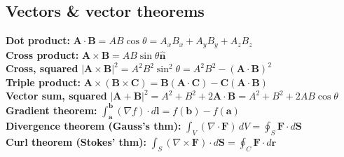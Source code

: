 \documentclass[letterpaper,landscape,10pt]{article}
\begin{document}
{\begin{multicols}{4}
	\subsection*{Vectors \& vector theorems}
	\textbf{Dot product:} $\bm{A} \cdot \bm{B} = AB\cos\theta = A_xB_x+A_yB_y+A_zB_z$ \\
	\textbf{Cross product:} $\bm{A} \times \bm{B} = AB\sin\theta \bm{\hat{n}}$ \\
	\textbf{Cross, squared} $| \bm{A}\times\bm{B} |^2 = A^2B^2\sin^2\theta = A^2B^2-\left( \bm{A}\cdot\bm{B} \right)^2$ \\
	\textbf{Triple product:} $\bm{A} \times \left(\bm{B}\times \bm{C}\right) = \bm{B}\left( \bm{A}\cdot\bm{C} \right) - \bm{C}\left( \bm{A}\cdot\bm{B} \right)$ \\
	\textbf{Vector sum, squared} $|\bm{A}+\bm{B}|^2 = A^2 + B^2 + 2\bm{A}\cdot\bm{B} = A^2+B^2+2AB\cos\theta$ \\
	\textbf{Gradient theorem:}
		$ \int_{\bm{a}}^{\bm{b}} \left( \nabla f \right) \cdot d\bm{l} = f(\bm{b})-f(\bm{a}) $ \\
	\textbf{Divergence theorem (Gauss's thm):}
		$ \int_{V}(\nabla\cdot \bm{F}) \, d{V} =
		\oint_S \bm{F} \cdot d\bm{S} $\\
	\textbf{Curl theorem (Stokes' thm):}
		$ \int_S \left(\nabla \times \bm{F}\right) \cdot d\bm{S} = \oint_C \bm{F}\cdot d\bm{r}$ \\



\end{multicols}}
\end{document}
